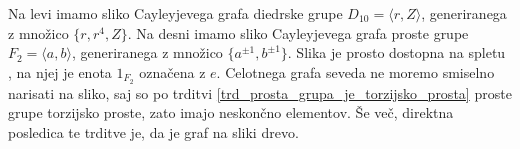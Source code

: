 \begin{primer}
Na levi imamo sliko Cayleyjevega grafa diedrske grupe $D_{10} = \langle r, Z \rangle$, generiranega z množico $\{ r, r^4 ,Z \}$. Na desni imamo sliko Cayleyjevega grafa proste grupe $F_2 = \langle a, b \rangle$, generiranega z množico $\{ a^{\pm 1}, b^{\pm 1} \}$. Slika je prosto dostopna na spletu \cite{wikipedia_cayley_graph},
na njej je enota $1_{F_2}$ označena z $e$. Celotnega grafa seveda ne moremo smiselno narisati na sliko, saj so po trditvi \ref{trd_prosta_grupa_je_torzijsko_prosta} proste grupe torzijsko proste, zato imajo neskončno elementov. 
Še več, direktna posledica te trditve je, da je graf na sliki drevo.

\begin{figure}[h]
    \centering
    \begin{minipage}[t]{0.45\textwidth}
        \centering
\end{minipage}
\end{figure}
\end{primer}
